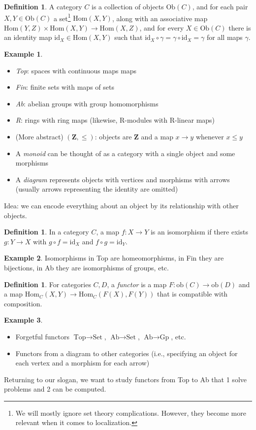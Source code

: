 \documentclass[12pt]{article}
\theoremstyle{definition}
\newtheorem{definition}[theorem]{Definition}
\newtheorem*{example}{Example}
\begin{document}
	\begin{definition}
		A category $C$ is a collection of objects $\text{Ob}(C)$, and for each pair $X,Y\in\text{Ob}(C)$ a set\footnote{We will mostly ignore set theory complications. However, they become more relevant when it comes to localization.} $\text{Hom}(X,Y)$, along with an associative map $\text{Hom}(Y,Z)\times \text{Hom}(X,Y)\to\text{Hom}(X,Z)$, and for every $X\in\text{Ob}(C)$ there is an identity map $\text{id}_X\in\text{Hom}(X,Y)$ such that $\text{id}_{X}\circ\gamma=\gamma\circ\text{id}_{X}=\gamma$ for all maps $\gamma$. 
	\end{definition} 
	\begin{example}
		\begin{itemize}
			\item \emph{Top}: spaces with continuous maps maps
			\item \emph{Fin}: finite sets with maps of sets
			\item \emph{Ab}: abelian groups with group homomorphisms
			\item \emph{R}: rings with ring maps (likewise, R-modules with R-linear maps)
			\item (More abstract) $(\mathbf{Z},\leq)$: objects are $\mathbf{Z}$ and a map $x\to y$ whenever $x\leq y$
			\item A \emph{monoid} can be thought of as a category with a single object and some morphisms
			\item A \emph{diagram} represents objects with vertices and morphisms with arrows (usually arrows representing the identity are omitted)
		\end{itemize}
	\end{example}
	Idea: we can encode everything about an object by its relationship with other objects. 
	\begin{definition}
		In a category $C$, a map $f:X\to Y$ is an isomorphism if there exists $g:Y\to X$ with $g\circ f=\text{id}_{X}$ and $f\circ g=\text{id}_{Y}$.
	\end{definition}
	\begin{example}
		Isomorphisms in Top are homeomorphisms, in Fin they are bijections, in Ab they are isomorphisms of groups, etc.
	\end{example}
	\begin{definition}
		For categories $C,D$, a \emph{functor} is a map $F:\text{ob}(C)\to \text{ob}(D)$ and a map $\text{Hom}_{C}(X,Y)\to\text{Hom}_{C}(F(X),F(Y))$ that is compatible with composition. 
	\end{definition}
	\begin{example}
		\begin{itemize}
			\item Forgetful functors $\text{Top}\to\text{Set}$, $\text{Ab}\to\text{Set}$, $\text{Ab}\to\text{Gp}$, etc. 
			\item Functors from a diagram to other categories (i.e., specifying an object for each vertex and a morphism for each arrow)
		\end{itemize}
	\end{example}
	Returning to our slogan, we want to study functors from Top to Ab that 1 solve problems and 2 can be computed. 
	
\end{document}
